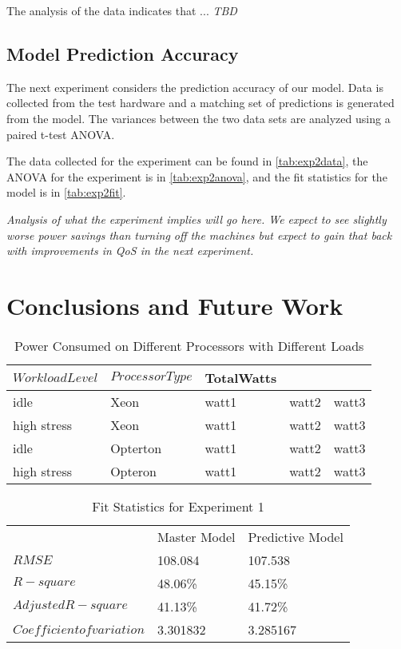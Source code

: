 \documentclass[times, 10pt,onecolumn]{article}
\begin{document}
The analysis of the data indicates that ... \textit{TBD}

\subsection{Model Prediction Accuracy}
\label{sec:linearreg}
The next experiment considers the prediction accuracy of our model.
Data is collected from the test hardware and a matching set of
predictions is generated from the model. The variances between the two
data sets are analyzed using a paired t-test ANOVA.

The data collected for the experiment can be found in \ref{tab:exp2data},
the ANOVA for the experiment is in \ref{tab:exp2anova}, and the fit
statistics for the model is in \ref{tab:exp2fit}.


\emph{Analysis of what the experiment implies will go here.  We expect to see
  slightly worse power savings than turning off the machines but expect to
  gain that back with improvements in QoS in the next experiment.}


\section{Conclusions and Future Work}
\label{sec:conclusions}

\label{sec:references}
\nocite{*}



\begin{table}
  \centering
  \begin{tabular}{l||l|lll}
    $WorkloadLevel$&$ProcessorType$&TotalWatts&&\\
    \hline
    idle&Xeon&watt1&watt2&watt3 \\
    high stress&Xeon&watt1&watt2&watt3 \\
    idle&Opterton&watt1&watt2&watt3 \\
    high stress&Opteron&watt1&watt2&watt3\\
  \end{tabular}
  \caption{Power Consumed on Different Processors with Different Loads}
  \label{tab:exp1design}
\end{table}

\begin{table}
  \centering
  \begin{tabular}{l|ll}
    &Master Model&Predictive Model \\
    $RMSE$&108.084&107.538\\
    $R-square$&48.06\%&45.15\% \\
    $Adjusted R-square$&41.13\%&41.72\% \\
    $Coefficient of variation$&3.301832&3.285167 \\
  \end{tabular}
  \caption{Fit Statistics for Experiment 1}
  \label{tab:exp1fit}
\end{table}
\end{document}
